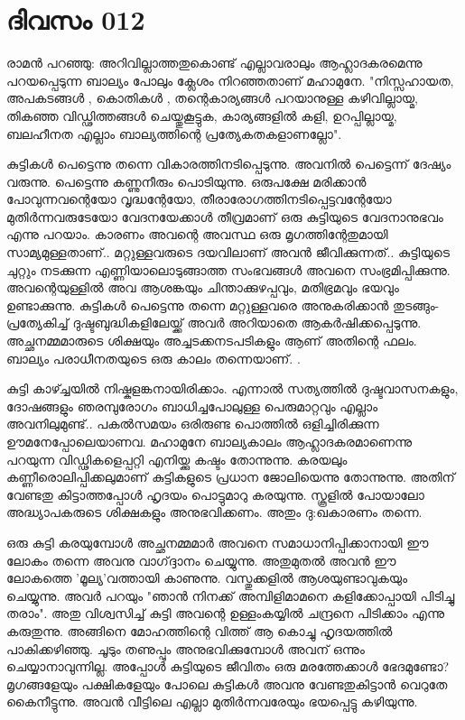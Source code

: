 \newpage
\section{ദിവസം 012}


രാമന്‍ പറഞ്ഞു: അറിവില്ലാത്തതുകൊണ്ട്‌ എല്ലാവരാലും ആഹ്ലാദകരമെന്നു പറയപ്പെടുന്ന ബാല്യം പോലും ക്ലേശം നിറഞ്ഞതാണ്‌ മഹാമുനേ. "നിസ്സഹായത, അപകടങ്ങള്‍ , കൊതികള്‍ , തന്റെകാര്യങ്ങള്‍ പറയാനുള്ള കഴിവില്ലായ്മ, തികഞ്ഞ വിഡ്ഢിത്തങ്ങള്‍ ചെയ്തുകൂട്ടുക, കാര്യങ്ങളില്‍ കളി, ഉറപ്പില്ലായ്മ, ബലഹീനത എല്ലാം ബാല്യത്തിന്റെ പ്രത്യേകതകളാണല്ലോ". 

കുട്ടികള്‍ പെട്ടെന്നു തന്നെ വികാരത്തിനടിപ്പെടുന്നു. അവനില്‍ പെട്ടെന്ന് ദേഷ്യം വരുന്നു. പെട്ടെന്നു കണ്ണുനീരും പൊടിയുന്നു. ഒരുപക്ഷേ മരിക്കാന്‍ പോവുന്നവന്റെയോ വൃദ്ധന്റേയോ, തീരാരോഗത്തിനടിപ്പെട്ടവന്റേയോ മുതിര്‍ന്നവരുടേയോ വേദനയേക്കാള്‍ തീവ്രമാണ്‌ ഒരു കുട്ടിയുടെ വേദനാനുഭവം എന്നു പറയാം. കാരണം അവന്റെ അവസ്ഥ ഒരു മൃഗത്തിന്റേതുമായി സാമ്യമുള്ളതാണ്‌.. മറ്റുള്ളവരുടെ ദയവിലാണ്‌ അവന്‍ ജീവിക്കുന്നത്‌.. കുട്ടിയുടെ ചുറ്റും നടക്കുന്ന എണ്ണിയാലൊടുങ്ങാത്ത സംഭവങ്ങള്‍ അവനെ സംഭ്രമിപ്പിക്കുന്നു. അവന്റെയുള്ളില്‍ അവ ആശങ്കയും ചിന്താക്കുഴപ്പവും, മതിഭ്രമവും ഭയവും ഉണ്ടാക്കുന്നു. കുട്ടികള്‍ പെട്ടെന്നു തന്നെ മറ്റുള്ളവരെ അനുകരിക്കാന്‍ തുടങ്ങും- പ്രത്യേകിച്ച്‌ ദുഷ്ടബുദ്ധികളിലേയ്ക്ക്‌ അവര്‍ അറിയാതെ ആകര്‍ഷിക്കപ്പെടുന്നു. അച്ഛനമ്മമാരുടെ ശിക്ഷയും അച്ചടക്കനടപടികളും ആണ്‌ അതിന്റെ ഫലം. ബാല്യം പരാധീനതയുടെ ഒരു കാലം തന്നെയാണ്‌. .

കുട്ടി കാഴ്ച്ചയില്‍ നിഷ്കളങ്കനായിരിക്കാം. എന്നാല്‍ സത്യത്തില്‍ ദുഷ്ടവാസനകളും, ദോഷങ്ങളും ഞരമ്പുരോഗം ബാധിച്ചപോലുള്ള പെരുമാറ്റവും എല്ലാം അവനിലുമുണ്ട്‌.. പകല്‍സമയം ഒരിരുണ്ട പൊത്തില്‍ ഒളിച്ചിരിക്കുന്ന ഊമനേപ്പോലെയാണവ. മഹാമുനേ ബാല്യകാലം ആഹ്ലാദകരമാണെന്നു പറയുന്ന വിഡ്ഢികളെപ്പറ്റി എനിയ്ക്കു കഷ്ടം തോന്നുന്നു. കരയലും കണ്ണീരൊലിപ്പിക്കലുമാണ്‌ കുട്ടികളുടെ പ്രധാന ജോലിയെന്നു തോന്നുന്നു. അതിന്‌ വേണ്ടതു കിട്ടാത്തപ്പോള്‍ ഹൃദയം പൊട്ടുമാറു കരയുന്നു. സ്കൂളില്‍ പോയാലോ അദ്ധ്യാപകരുടെ ശിക്ഷകളും അനുഭവിക്കണം. അതും ദു:ഖകാരണം തന്നെ.

ഒരു കുട്ടി കരയുമ്പോള്‍ അച്ഛനമ്മമാര്‍ അവനെ സമാധാനിപ്പിക്കാനായി ഈ ലോകം തന്നെ അവനു വാഗ്ദ്ദാനം ചെയ്യുന്നു. അതുമുതല്‍ അവന്‍ ഈ ലോകത്തെ 'മൂല്യ'വത്തായി കാണുന്നു. വസ്തുക്കളില്‍ ആശയുണ്ടാവുകയും ചെയ്യുന്നു. അവര്‍ പറയും "ഞാന്‍ നിനക്ക്‌ അമ്പിളിമാമനെ കളിക്കോപ്പായി പിടിച്ചു തരാം". അതു വിശ്വസിച്ച്‌ കുട്ടി അവന്റെ ഉള്ളംകയ്യില്‍ ചന്ദ്രനെ പിടിക്കാം എന്നു കരുതുന്നു. അങ്ങിനെ മോഹത്തിന്റെ വിത്ത്‌ ആ കൊച്ചു ഹൃദയത്തില്‍ പാകിക്കഴിഞ്ഞു. ചൂടും തണുപ്പും അനുഭവിക്കുമ്പോള്‍ അവന്‌ ഒന്നും ചെയ്യാനാവുന്നില്ല. അപ്പോള്‍ കുട്ടിയുടെ ജീവിതം ഒരു മരത്തേക്കാള്‍ ഭേദമുണ്ടോ? മൃഗങ്ങളേയും പക്ഷികളേയും പോലെ കുട്ടികള്‍ അവനു വേണ്ടതുകിട്ടാന്‍ വെറുതേ കൈനീട്ടുന്നു. അവന്‍ വീട്ടിലെ എല്ലാ മുതിര്‍ന്നവരേയും ഭയപ്പെട്ടു കഴിയുന്നു.
